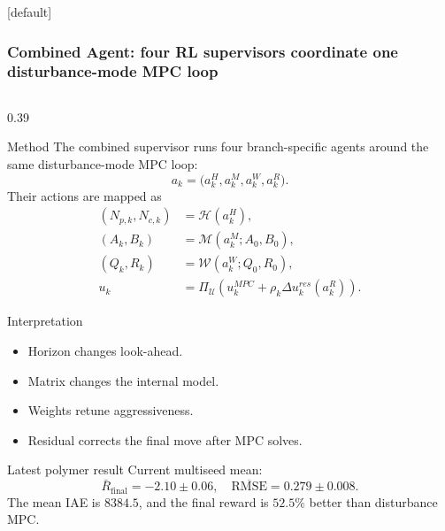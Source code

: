 \documentclass[aspectratio=169]{beamer}
\begin{document}
\begin{frame}
[default]
\frametitle{\large \textbf{Combined Agent: four RL supervisors coordinate one disturbance-mode MPC loop}}
\tiny
\vspace{-0.32cm}

\begin{columns}[T,onlytextwidth]

\begin{column}{0.39\textwidth}
\begin{block}{Method}
\justifying
The combined supervisor runs four branch-specific agents around the same disturbance-mode MPC loop:
\[
a_k = \big(a_k^{H},a_k^{M},a_k^{W},a_k^{R}\big).
\]
Their actions are mapped as
\[
\begin{aligned}
(N_{p,k},N_{c,k}) &= \mathcal{H}(a_k^{H}), \\
(A_k,B_k) &= \mathcal{M}(a_k^{M};A_0,B_0), \\
(Q_k,R_k) &= \mathcal{W}(a_k^{W};Q_0,R_0), \\
u_k &= \Pi_{\mathcal U}\!\left(u_k^{MPC}+\rho_k\Delta u_k^{res}(a_k^{R})\right).
\end{aligned}
\]
\end{block}

\vspace{0.02cm}

\begin{block}{Interpretation}
\begin{itemize}\justifying
  \setlength{\itemsep}{0.20ex}
  \item Horizon changes look-ahead.
  \item Matrix changes the internal model.
  \item Weights retune aggressiveness.
  \item Residual corrects the final move after MPC solves.
\end{itemize}
\end{block}

\vspace{0.02cm}

\begin{block}{Latest polymer result}
\justifying
Current multiseed mean:
\[
\bar{R}_{\mathrm{final}}=-2.10\pm 0.06,\quad
\overline{\mathrm{RMSE}}=0.279\pm 0.008.
\]
The mean IAE is \(8384.5\), and the final reward is \(52.5\%\) better than disturbance MPC.
\end{block}
\end{column}


\end{columns}
\end{frame}
\end{document}
